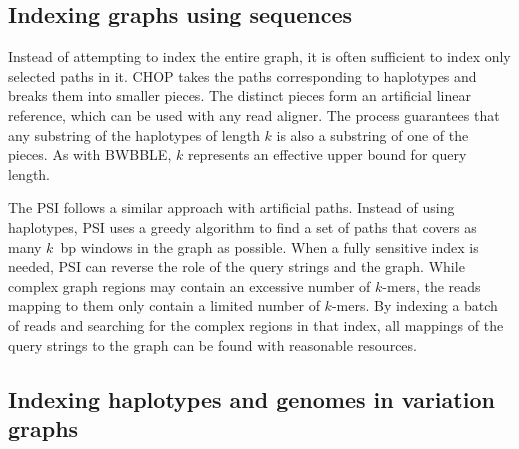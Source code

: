 \subsection{Indexing graphs using sequences}

Instead of attempting to index the entire graph, it is often sufficient to index only selected paths in it.
\textsc{CHOP} \cite{Mokveld_2018} takes the paths corresponding to haplotypes and breaks them into smaller pieces.
The distinct pieces form an artificial linear reference, which can be used with any read aligner.
The process guarantees that any substring of the haplotypes of length $k$ is also a substring of one of the pieces.
As with \textsc{BWBBLE}, $k$ represents an effective upper bound for query length.

The \textsc{PSI} \cite{Ghaffaari_2019} follows a similar approach with artificial paths.
Instead of using haplotypes, \textsc{PSI} uses a greedy algorithm to find a set of paths that covers as many $k$~bp windows in the graph as possible.
When a fully sensitive index is needed, \textsc{PSI} can reverse the role of the query strings and the graph.
While complex graph regions may contain an excessive number of $k$-mers, the reads mapping to them only contain a limited number of $k$-mers.
By indexing a batch of reads and searching for the complex regions in that index, all mappings of the query strings to the graph can be found with reasonable resources.

\subsection{Indexing haplotypes and genomes in variation graphs}


